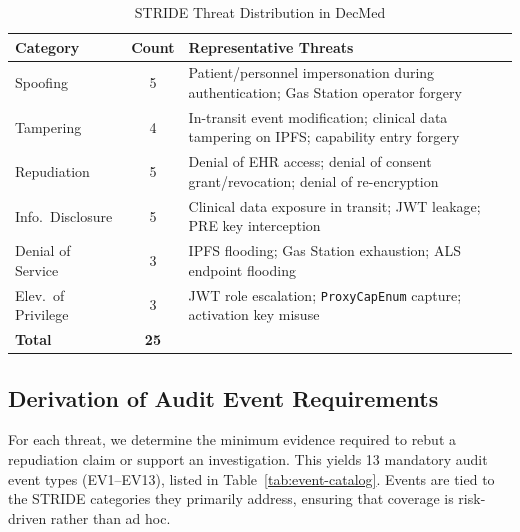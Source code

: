 \begin{table}[htbp]
    \caption{STRIDE Threat Distribution in DecMed}
    \label{tab:stride-distribution}
    \begin{center}
        \begin{tabular}{l c p{4.8cm}}
            \toprule
            \textbf{Category} & \textbf{Count} & \textbf{Representative Threats} \\
            \midrule
            Spoofing           & 5 & Patient/personnel impersonation during authentication; Gas Station operator forgery \\
            Tampering          & 4 & In-transit event modification; clinical data tampering on IPFS; capability entry forgery \\
            Repudiation        & 5 & Denial of EHR access; denial of consent grant/revocation; denial of re-encryption \\
            Info.\ Disclosure  & 5 & Clinical data exposure in transit; JWT leakage; PRE key interception \\
            Denial of Service  & 3 & IPFS flooding; Gas Station exhaustion; ALS endpoint flooding \\
            Elev.\ of Privilege & 3 & JWT role escalation; \texttt{ProxyCapEnum} capture; activation key misuse \\
            \midrule
            \textbf{Total}     & \textbf{25} & \\
            \bottomrule
        \end{tabular}
    \end{center}
\end{table}

\subsection{Derivation of Audit Event Requirements}

For each threat, we determine the minimum evidence required to rebut a
repudiation claim or support an investigation. This yields 13 mandatory
audit event types (EV1--EV13), listed in Table~\ref{tab:event-catalog}.
Events are tied to the STRIDE categories they primarily address, ensuring
that coverage is risk-driven rather than ad hoc.

